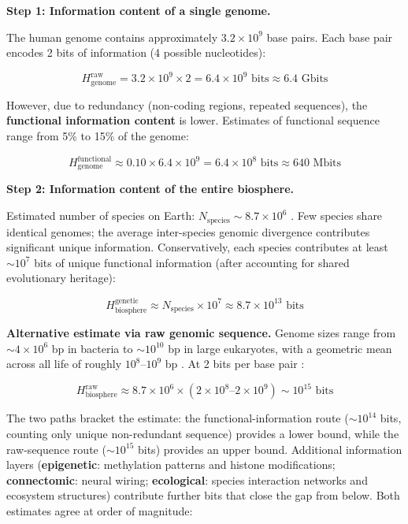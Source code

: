 \documentclass[11pt]{article}
\theoremstyle{plain}
\theoremstyle{definition}
\theoremstyle{remark}
\begin{document}
\textbf{Step 1: Information content of a single genome.}

The human genome contains approximately \(3.2 \times 10^9\) base pairs.
Each base pair encodes 2 bits of information (4 possible nucleotides):

\[H_{\text{genome}}^{\text{raw}} = 3.2 \times 10^9 \times 2 = 6.4 \times 10^9 \text{ bits} \approx 6.4 \text{ Gbits}\]

However, due to redundancy (non-coding regions, repeated sequences), the
\textbf{functional information content} is lower. Estimates of
functional sequence range from 5\% \citep{Kellis2014} to 15\%
\citep{Graur2017} of the genome:

\[H_{\text{genome}}^{\text{functional}} \approx 0.10 \times 6.4 \times 10^9 = 6.4 \times 10^8 \text{ bits} \approx 640 \text{ Mbits}\]

\textbf{Step 2: Information content of the entire biosphere.}

Estimated number of species on Earth:
\(N_{\text{species}} \sim 8.7 \times 10^6\) \citep{Mora2011}. Few
species share identical genomes; the average inter-species genomic
divergence contributes significant unique information. Conservatively,
each species contributes at least \(\sim 10^7\) bits of unique
functional information (after accounting for shared evolutionary
heritage):

\[H_{\text{biosphere}}^{\text{genetic}} \approx N_{\text{species}} \times 10^7 \approx 8.7 \times 10^{13} \text{ bits}\]

\textbf{Alternative estimate via raw genomic sequence.} Genome sizes
range from \(\sim 4 \times 10^6\) bp in bacteria to \(\sim 10^{10}\) bp
in large eukaryotes, with a geometric mean across all life of roughly
\(10^8\)--\(10^9\) bp \citep{Milo2015}. At 2 bits per base pair
\citep{Adami2004}:

\[H_{\text{biosphere}}^{\text{raw}} \approx 8.7 \times 10^6 \times (2 \times 10^8 \text{–} 2 \times 10^9) \sim 10^{15} \text{ bits}\]

The two paths bracket the estimate: the functional-information route
(\(\sim 10^{14}\) bits, counting only unique non-redundant sequence)
provides a lower bound, while the raw-sequence route (\(\sim 10^{15}\)
bits) provides an upper bound. Additional information layers
(\textbf{epigenetic}: methylation patterns and histone modifications;
\textbf{connectomic}: neural wiring; \textbf{ecological}: species
interaction networks and ecosystem structures) contribute further bits
that close the gap from below. Both estimates agree at order of
magnitude:
\end{document}
